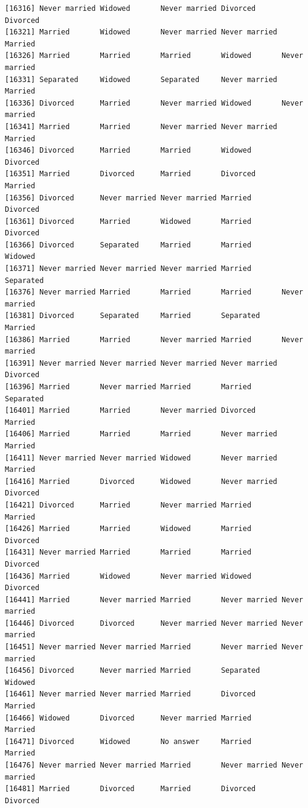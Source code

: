 \documentclass[
  letterpaper,
  DIV=11,
  numbers=noendperiod,
  oneside]{scrartcl}
\begin{document}
\begin{verbatim}
[16316] Never married Widowed       Never married Divorced      Divorced     
[16321] Married       Widowed       Never married Never married Married      
[16326] Married       Married       Married       Widowed       Never married
[16331] Separated     Widowed       Separated     Never married Married      
[16336] Divorced      Married       Never married Widowed       Never married
[16341] Married       Married       Never married Never married Married      
[16346] Divorced      Married       Married       Widowed       Divorced     
[16351] Married       Divorced      Married       Divorced      Married      
[16356] Divorced      Never married Never married Married       Divorced     
[16361] Divorced      Married       Widowed       Married       Divorced     
[16366] Divorced      Separated     Married       Married       Widowed      
[16371] Never married Never married Never married Married       Separated    
[16376] Never married Married       Married       Married       Never married
[16381] Divorced      Separated     Married       Separated     Married      
[16386] Married       Married       Never married Married       Never married
[16391] Never married Never married Never married Never married Divorced     
[16396] Married       Never married Married       Married       Separated    
[16401] Married       Married       Never married Divorced      Married      
[16406] Married       Married       Married       Never married Married      
[16411] Never married Never married Widowed       Never married Married      
[16416] Married       Divorced      Widowed       Never married Divorced     
[16421] Divorced      Married       Never married Married       Married      
[16426] Married       Married       Widowed       Married       Divorced     
[16431] Never married Married       Married       Married       Divorced     
[16436] Married       Widowed       Never married Widowed       Divorced     
[16441] Married       Never married Married       Never married Never married
[16446] Divorced      Divorced      Never married Never married Never married
[16451] Never married Never married Married       Never married Never married
[16456] Divorced      Never married Married       Separated     Widowed      
[16461] Never married Never married Married       Divorced      Married      
[16466] Widowed       Divorced      Never married Married       Married      
[16471] Divorced      Widowed       No answer     Married       Married      
[16476] Never married Never married Married       Never married Never married
[16481] Married       Divorced      Married       Divorced      Divorced     

\end{verbatim}
\end{document}
